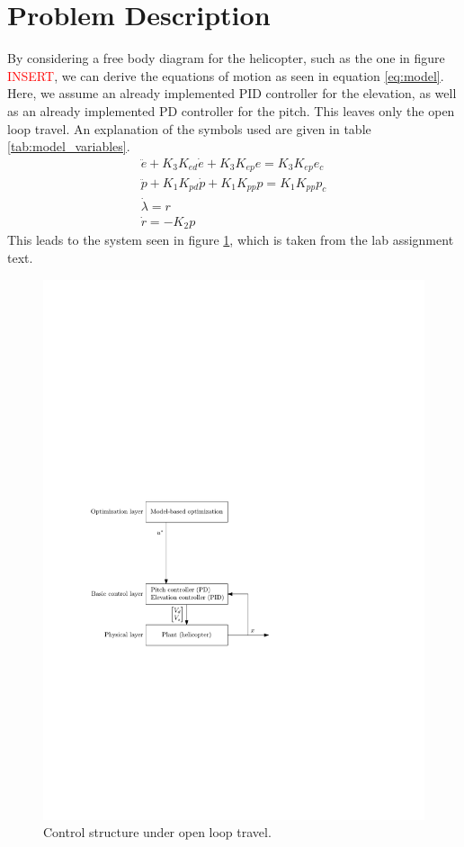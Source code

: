 \section{Problem Description}\label{sec:problem_description}
By considering a free body diagram for the helicopter, such as the one in figure \textcolor{red}{INSERT}, we can derive the equations of motion as seen in equation \ref{eq:model}. Here, we assume an already implemented PID controller for the elevation, as well as an already implemented PD controller for the pitch. This leaves only the open loop travel. An explanation of the symbols used are given in table \ref{tab:model_variables}.
\begin{subequations}\label{eq:model}
	\begin{gather}
		\ddot{e} + K_{3} K_{ed} \dot{e} + K_{3} K_{ep} e = K_{3} K_{ep} e_{c}\\
		\ddot{p} + K_{1} K_{pd} \dot{p} + K_{1} K_{pp} p = K_{1} K_{pp} p_{c}\\
		\dot{\lambda} = r\\
		\dot{r} = -K_{2} p
	\end{gather}
\end{subequations}
This leads to the system seen in figure \ref{fig:layers_openloop}, which is taken from the lab assignment text.
\begin{figure}[hb]
	\centering
	\includegraphics[width=1.00\textwidth]{figures/layers_openloop.pdf}
	\caption{Control structure under open loop travel.}
\label{fig:layers_openloop}
\end{figure}

